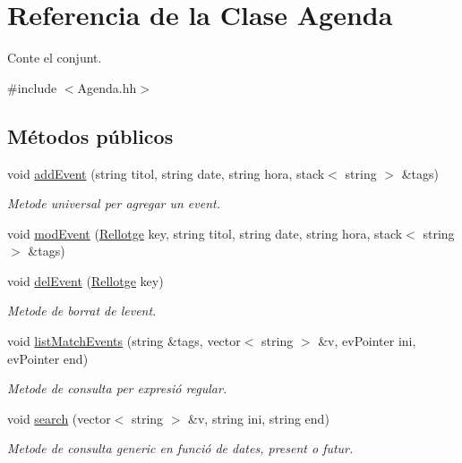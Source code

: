 \hypertarget{class_agenda}{}\section{Referencia de la Clase Agenda}
\label{class_agenda}


Conte el conjunt.  




{\ttfamily \#include $<$Agenda.\+hh$>$}

\subsection*{Métodos públicos}
\begin{DoxyCompactItemize}
\item 
void \hyperlink{class_agenda_a2c929acc7e13b65b5a597b94db249c08}{add\+Event} (string titol, string date, string hora, stack$<$ string $>$ \&tags)
\begin{DoxyCompactList}\small\item\em Metode universal per agregar un event. \end{DoxyCompactList}\item 
void \hyperlink{class_agenda_abd4b2a2bb44123f0dafdf9d998503ef6}{mod\+Event} (\hyperlink{class_rellotge}{Rellotge} key, string titol, string date, string hora, stack$<$ string $>$ \&tags)
\item 
void \hyperlink{class_agenda_ae71248c9fc4536a04ee92e4702cf1f64}{del\+Event} (\hyperlink{class_rellotge}{Rellotge} key)
\begin{DoxyCompactList}\small\item\em Metode de borrat de l\textquotesingle{}event. \end{DoxyCompactList}\item 
void \hyperlink{class_agenda_a8597c9f9b56ed54b9b91594c4c204de5}{list\+Match\+Events} (string \&tags, vector$<$ string $>$ \&v, ev\+Pointer ini, ev\+Pointer end)
\begin{DoxyCompactList}\small\item\em Metode de consulta per expresió regular. \end{DoxyCompactList}\item 
void \hyperlink{class_agenda_a93fe3e71fb6d328789fccb791bac4226}{search} (vector$<$ string $>$ \&v, string ini, string end)
\begin{DoxyCompactList}\small\item\em Metode de consulta generic en funció de dates, present o futur. \end{DoxyCompactList}\end{DoxyCompactItemize}


